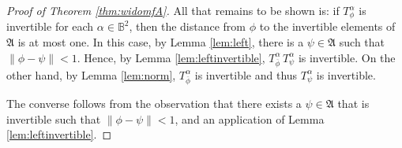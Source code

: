 \documentclass[12pt]{amsart}
\theoremstyle{definition}
\theoremstyle{remark}
\numberwithin{equation}{section}
\begin{document}
\begin{proof}[Proof of Theorem \ref{thm:widomfA}]
All that remains to be shown is: if $T^\alpha_\phi$ is invertible for each $\alpha\in{\mathbb{B}^2}$, then the distance from $\phi$ to the invertible
elements of ${\mathfrak{A}}$ is at most one.  In this case, by Lemma \ref{lem:left}, there is a $\psi\in {\mathfrak{A}}$ such that $\|\phi-\psi\|<1$.  Hence,
by Lemma \ref{lem:leftinvertible}, $T^\alpha_{\overline{\phi}} \, T^\alpha_{\psi}$ is invertible. On the other hand,
by Lemma \ref{lem:norm}, $T^\alpha_{\overline{\phi}}$ is invertible  and thus $T^\alpha_\psi$ is invertible.

{The converse follows from the observation that there exists a $\psi \in {\mathfrak{A}}$ that is invertible such that $\|\phi - \psi \| < 1$, and  an application of Lemma \ref{lem:leftinvertible}.}
\end{proof}
\end{document}
